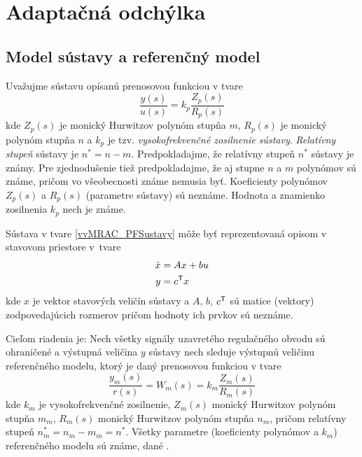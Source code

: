 \documentclass[a4paper, 10pt, ]{article}
\begin{document}
\section{Adaptačná odchýlka}



\subsection{Model sústavy a referenčný model}

Uvažujme sústavu opísanú prenosovou funkciou v tvare
\begin{equation} \label{vvMRAC_PFSustavy}
	\frac{y(s)}{u(s)} = 	k_p 	\frac{Z_p(s)}{R_p(s)}
\end{equation}
kde $Z_p(s)$ je monický Hurwitzov polynóm stupňa $m$, $R_p(s)$ je monický polynóm stupňa $n$ a $k_p$ je tzv. \emph{vysokofrekvenčné zosilnenie sústavy}. \emph{Relatívny stupeň} sústavy je $n^* = n - m$. Predpokladajme, že relatívny stupeň $n^*$ sústavy je známy. Pre zjednodušenie tiež predpokladajme, že aj stupne $n$ a $m$ polynómov sú známe, pričom vo všeobecnosti známe nemusia byť. Koeficienty polynómov $Z_p(s)$ a $R_p(s)$ (parametre sústavy) sú neznáme. Hodnota a znamienko zosilnenia $k_p$ nech je známe.

Sústava v tvare \eqref{vvMRAC_PFSustavy} môže byť reprezentovaná opisom v stavovom priestore v~tvare
\begin{subequations}  \label{vvMRACStavOpisSust}
	\begin{align}
		 \dot x  &= A x + b u \\
		 y &= c^{\mathsf{T}} x
	\end{align}
\end{subequations}
kde $x$ je vektor stavových veličín sústavy a $A$, $b$, $c^{\mathsf{T}}$ sú matice (vektory) zodpovedajúcich rozmerov pričom hodnoty ich prvkov sú neznáme.

Cieľom riadenia je: Nech všetky signály uzavretého regulačného obvodu sú ohraničené a výstupná veličina $y$ sústavy nech sleduje výstupnú veličinu referenčného modelu, ktorý je daný prenosovou funkciou v tvare
\begin{equation} \label{vvMRAC_PFRefModel}
	\frac{y_m(s)}{r(s)} = W_m(s) = k_m \frac{Z_m(s)}{R_m(s)}
\end{equation}
kde $k_m$ je vysokofrekvenčné zosilnenie, $Z_m(s)$ monický Hurwitzov polynóm stupňa $m_m$, $R_m(s)$ monický Hurwitzov polynóm stupňa $n_m$, pričom relatívny stupeň $n^*_m = n_m - m_m = n^*$. Všetky parametre (koeficienty polynómov a $k_m$) referenčného modelu sú známe, dané .
\end{document}
